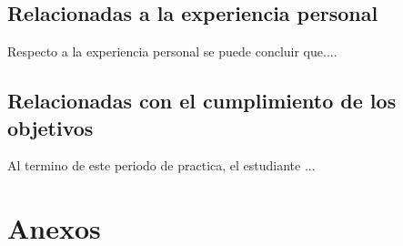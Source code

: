 \documentclass[12pt,letter,spanish]{article}
\begin{document}
\subsection{Relacionadas a la experiencia personal}
Respecto a la experiencia personal se puede concluir que....

\subsection{Relacionadas con el cumplimiento de los objetivos}

Al termino de este periodo de practica, el estudiante ...




\newpage
{}
\printbibliography
 

\newpage
\hspace{0pt}
\vfill

\section*{\centering Anexos}
\vfill
\hspace{0pt}

\end{document}
